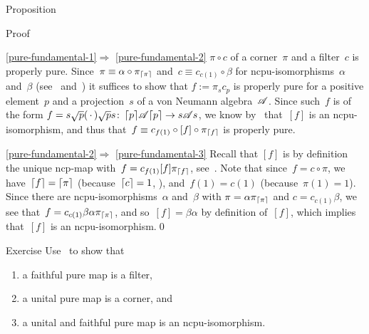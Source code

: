 \documentclass[a]{subfiles}
\begin{document}
\begin{parsec}
\begin{point}{Proposition}
\begin{point}{Proof}
\begin{point}{\ref{pure-fundamental-1}$\Longrightarrow$%
\ref{pure-fundamental-2}}
$\pi\circ c$ of a corner~$\pi$ and a filter~$c$
is properly pure.
Since~$\pi\equiv \alpha\circ \pi_{\left\lceil\pi\right\rceil}$
and~$c\equiv c_{c(1)}\circ \beta$
for ncpu-isomorphisms~$\alpha$ and~$\beta$
(see~
and~)
it suffices to show that
$f:=\pi_{s} c_{p}$ is properly pure
for a positive element~$p$ and a projection~$s$
of a von Neumann algebra~$\mathscr{A}$.
Since such~$f$ is of the form $f=s\sqrt{p}(\,\cdot\,)\sqrt{p}s
\colon \left\lceil p\right\rceil\!\mathscr{A}\!\left\lceil p\right\rceil\to s\mathscr{A} s$,
we know by~
that~$[f]$ is an ncpu-isomorphism,
and thus that~$f\equiv c_{f(1)}\circ [f]\circ \pi_{\left\lceil f\right\rceil}$ is properly pure.
\end{point}
\begin{point}{\ref{pure-fundamental-2}$\Longrightarrow$%
\ref{pure-fundamental-3}}%
Recall that $[f]$
is by definition the unique ncp-map
with~$f = c_{f(1)} [f] \pi_{\left\lceil f\right\rceil}$,
see~.
Note that since~$f=c\circ \pi$,
we have~$\left\lceil f\right\rceil=\left\lceil\pi\right\rceil$ (because~$\left\lceil c\right\rceil=1$, ),
and~$f(1)=c(1)$ (because~$\pi(1)=1$).
Since there are ncpu-isomorphisms~$\alpha$ and~$\beta$
with $\pi= \alpha \pi_{\left\lceil\pi\right\rceil}$ and  $c=c_{c(1)} \beta$,
we see that~$f=c_{c(1)} \beta\alpha \pi_{\left\lceil\pi\right\rceil}$,
and so~$[f]=\beta\alpha$
by definition of~$[f]$,
which implies that~$[f]$ is an ncpu-isomorphism.\qed
\end{point}
\end{point}
\end{point}
\begin{point}{Exercise}%
Use~ to show that 
\begin{enumerate}
\item
a faithful pure map is a filter,
\item
a unital pure map is a corner, and
\item
a unital and faithful pure map is an ncpu-isomorphism.
\end{enumerate}
\end{point}
\end{parsec}
\end{document}
